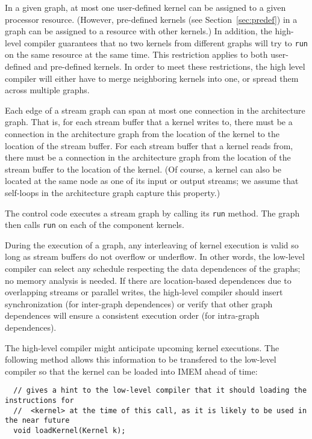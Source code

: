 In a given graph, at most one user-defined kernel can be assigned to a
given processor resource.  (However, pre-defined kernels (see
Section~\ref{sec:predef}) in a graph can be assigned to a resource
with other kernels.)  In addition, the high-level compiler guarantees
that no two kernels from different graphs will try to {\tt run} on the
same resource at the same time.  This restriction applies to both
user-defined and pre-defined kernels.  In order to meet these
restrictions, the high level compiler will either have to merge
neighboring kernels into one, or spread them across multiple graphs.

Each edge of a stream graph can span at most one connection in the
architecture graph.  That is, for each stream buffer that a kernel
writes to, there must be a connection in the architecture graph from
the location of the kernel to the location of the stream buffer.  For
each stream buffer that a kernel reads from, there must be a
connection in the architecture graph from the location of the stream
buffer to the location of the kernel.  (Of course, a kernel can also
be located at the same node as one of its input or output streams; we
assume that self-loops in the architecture graph capture this
property.)


The control code executes a stream graph by calling its {\tt run}
method.  The graph then calls {\tt run} on each of the component
kernels.  

During the execution of a graph, any interleaving of kernel execution
is valid so long as stream buffers do not overflow or underflow.  In
other words, the low-level compiler can select any schedule respecting
the data dependences of the graphs; no memory analysis is needed.  If
there are location-based dependences due to overlapping streams or
parallel writes, the high-level compiler should insert synchronization
(for inter-graph dependences) or verify that other graph dependences
will ensure a consistent execution order (for intra-graph
dependences).

The high-level compiler might anticipate upcoming kernel executions.
The following method allows this information to be transfered to the
low-level compiler so that the kernel can be loaded into IMEM ahead of
time:
\begin{verbatim}
  // gives a hint to the low-level compiler that it should loading the instructions for
  //  <kernel> at the time of this call, as it is likely to be used in the near future
  void loadKernel(Kernel k);
\end{verbatim}

